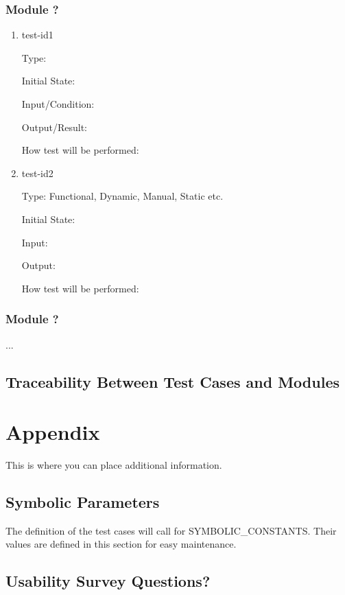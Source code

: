 \documentclass[12pt, titlepage]{article}
\begin{document}
\subsubsection{Module ?}
		
\begin{enumerate}

\item{test-id1\\}

Type: 
					
Initial State: 
					
Input/Condition: 
					
Output/Result: 
					
How test will be performed: 
					
\item{test-id2\\}

Type: Functional, Dynamic, Manual, Static etc.
					
Initial State: 
					
Input: 
					
Output: 
					
How test will be performed: 

\end{enumerate}

\subsubsection{Module ?}

...

\subsection{Traceability Between Test Cases and Modules}

				




\newpage

\section{Appendix}

This is where you can place additional information.

\subsection{Symbolic Parameters}

The definition of the test cases will call for SYMBOLIC\_CONSTANTS.
Their values are defined in this section for easy maintenance.

\subsection{Usability Survey Questions?}

\end{document}
